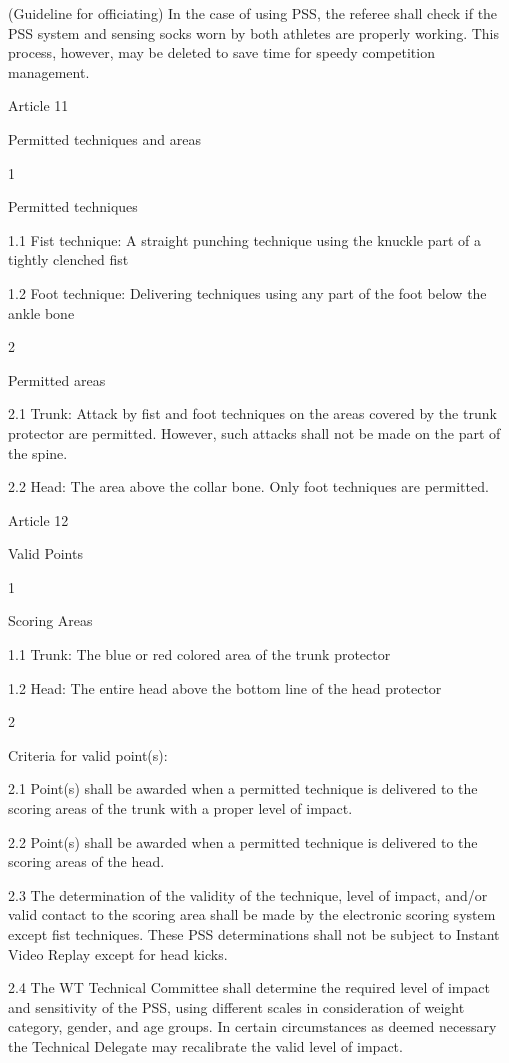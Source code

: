 \documentclass[
]{report}
\begin{document}
(Guideline for officiating) In the case of using PSS, the referee shall
check if the PSS system and sensing socks worn by both athletes are
properly working. This process, however, may be deleted to save time for
speedy competition management.

Article 11

Permitted techniques and areas

1

Permitted techniques

1.1 Fist technique: A straight punching technique using the knuckle part
of a tightly clenched fist

1.2 Foot technique: Delivering techniques using any part of the foot
below the ankle bone

2

Permitted areas

2.1 Trunk: Attack by fist and foot techniques on the areas covered by
the trunk protector are permitted. However, such attacks shall not be
made on the part of the spine.

2.2 Head: The area above the collar bone. Only foot techniques are
permitted.

Article 12

Valid Points

1

Scoring Areas

1.1 Trunk: The blue or red colored area of the trunk protector

1.2 Head: The entire head above the bottom line of the head protector

2

Criteria for valid point(s):

2.1 Point(s) shall be awarded when a permitted technique is delivered to
the scoring areas of the trunk with a proper level of impact.

2.2 Point(s) shall be awarded when a permitted technique is delivered to
the scoring areas of the head.

2.3 The determination of the validity of the technique, level of impact,
and/or valid contact to the scoring area shall be made by the electronic
scoring system except fist techniques. These PSS determinations shall
not be subject to Instant Video Replay except for head kicks.

2.4 The WT Technical Committee shall determine the required level of
impact and sensitivity of the PSS, using different scales in
consideration of weight category, gender, and age groups. In certain
circumstances as deemed necessary the Technical Delegate may recalibrate
the valid level of impact.
\end{document}

